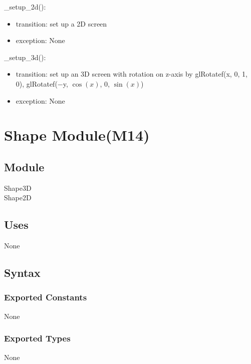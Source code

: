 \documentclass{article}
\begin{document}
\noindent \_setup\_2d():
\begin{itemize}
\item transition: set up a 2D screen
\item exception: None
\end{itemize}\vspace{6mm}

\noindent \_setup\_3d():
\begin{itemize}
\item transition: set up an 3D screen with rotation on z-axis by glRotatef(x, 0, 1, 0), glRotatef($-$y, $\cos(x)$, 0, $\sin(x)$)
\item exception: None
\end{itemize}\vspace{6mm}

\newpage


\section {Shape Module(M14)}

\subsection{Module}

Shape3D\\
Shape2D

\subsection {Uses}
None

\subsection {Syntax}

\subsubsection {Exported Constants}
None

\subsubsection {Exported Types}
None
\end{document}
